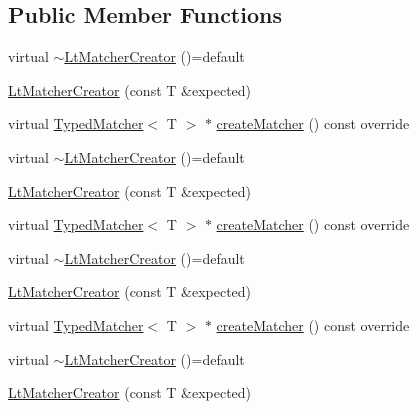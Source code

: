 \subsection*{Public Member Functions}
\begin{DoxyCompactItemize}
\item 
virtual \mbox{\hyperlink{structfakeit_1_1internal_1_1LtMatcherCreator_a6a496de15c15d4a1345baf1d14e17a8f}{$\sim$\+Lt\+Matcher\+Creator}} ()=default
\item 
\mbox{\hyperlink{structfakeit_1_1internal_1_1LtMatcherCreator_ab8164ead0551b2b74d936d590b970392}{Lt\+Matcher\+Creator}} (const T \&expected)
\item 
virtual \mbox{\hyperlink{structfakeit_1_1TypedMatcher}{Typed\+Matcher}}$<$ T $>$ $\ast$ \mbox{\hyperlink{structfakeit_1_1internal_1_1LtMatcherCreator_a3eb22e77b3c4622fa47160d9bc689c8e}{create\+Matcher}} () const override
\item 
virtual \mbox{\hyperlink{structfakeit_1_1internal_1_1LtMatcherCreator_a6a496de15c15d4a1345baf1d14e17a8f}{$\sim$\+Lt\+Matcher\+Creator}} ()=default
\item 
\mbox{\hyperlink{structfakeit_1_1internal_1_1LtMatcherCreator_ab8164ead0551b2b74d936d590b970392}{Lt\+Matcher\+Creator}} (const T \&expected)
\item 
virtual \mbox{\hyperlink{structfakeit_1_1TypedMatcher}{Typed\+Matcher}}$<$ T $>$ $\ast$ \mbox{\hyperlink{structfakeit_1_1internal_1_1LtMatcherCreator_a3eb22e77b3c4622fa47160d9bc689c8e}{create\+Matcher}} () const override
\item 
virtual \mbox{\hyperlink{structfakeit_1_1internal_1_1LtMatcherCreator_a6a496de15c15d4a1345baf1d14e17a8f}{$\sim$\+Lt\+Matcher\+Creator}} ()=default
\item 
\mbox{\hyperlink{structfakeit_1_1internal_1_1LtMatcherCreator_ab8164ead0551b2b74d936d590b970392}{Lt\+Matcher\+Creator}} (const T \&expected)
\item 
virtual \mbox{\hyperlink{structfakeit_1_1TypedMatcher}{Typed\+Matcher}}$<$ T $>$ $\ast$ \mbox{\hyperlink{structfakeit_1_1internal_1_1LtMatcherCreator_a3eb22e77b3c4622fa47160d9bc689c8e}{create\+Matcher}} () const override
\item 
virtual \mbox{\hyperlink{structfakeit_1_1internal_1_1LtMatcherCreator_a6a496de15c15d4a1345baf1d14e17a8f}{$\sim$\+Lt\+Matcher\+Creator}} ()=default
\item 
\mbox{\hyperlink{structfakeit_1_1internal_1_1LtMatcherCreator_ab8164ead0551b2b74d936d590b970392}{Lt\+Matcher\+Creator}} (const T \&expected)
\item 

\end{DoxyCompactItemize}
